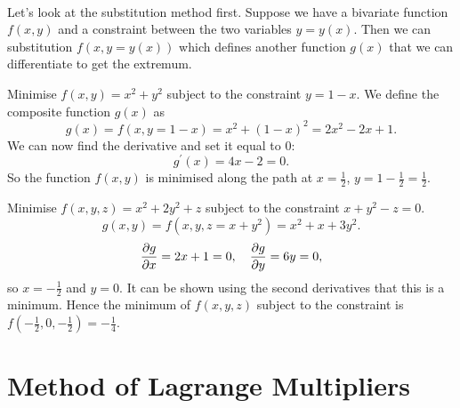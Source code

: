\documentclass[../multivariate_calculus.tex]{subfiles}
\begin{document}
        \paragraph{}
        Let's look at the substitution method first.
        Suppose we have a bivariate function $f(x,y)$ and a constraint between the two variables $y=y(x)$.
        Then we can substitution $f(x,y=y(x))$ which defines another function $g(x)$ that we can differentiate to get the extremum.
        \begin{example}
            Minimise $f(x,y)=x^2+y^2$ subject to the constraint $y=1-x$.
            We define the composite function $g(x)$ as
            \begin{equation}
                g(x)=f(x,y=1-x)=x^2+(1-x)^2=2x^2-2x+1.
            \end{equation}
            We can now find the derivative and set it equal to 0:
            \begin{equation}
                g^\prime(x)=4x-2=0.
            \end{equation}
            So the function $f(x,y)$ is minimised along the path at $x=\frac{1}{2}$, $y=1-\frac{1}{2}=\frac{1}{2}$.
        \end{example}
        \begin{example}
            Minimise $f(x,y,z)=x^2+2y^2+z$ subject to the constraint $x+y^2-z=0$.
            \begin{equation}
                g(x,y)=f(x,y,z=x+y^2)=x^2+x+3y^2.
            \end{equation}
            \begin{equation}
                \pdv{g}{x}=2x+1=0,\quad\pdv{g}{y}=6y=0,
            \end{equation}
            so $x=-\frac{1}{2}$ and $y=0$. 
            It can be shown using the second derivatives that this is a minimum.
            Hence the minimum of $f(x,y,z)$ subject to the constraint is $f(-\frac{1}{2},0,-\frac{1}{2})=-\frac{1}{4}$.
        \end{example}

    \section{Method of Lagrange Multipliers}
\end{document}
